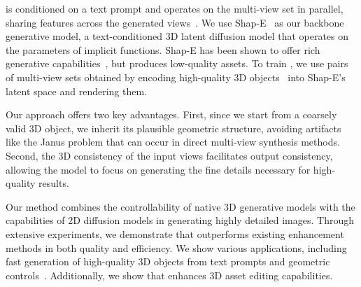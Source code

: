 \ourname{} is conditioned on a text prompt and operates on the multi-view set in parallel, sharing features across the generated views~\cite{shi2024mvdream, shi2023zero123singleimageconsistent}. We use Shap-E~\cite{jun2023shape} as our backbone generative model, a text-conditioned 3D latent diffusion model that operates on the parameters of implicit functions. Shap-E has been shown to offer rich generative capabilities~\cite{chen2023shapeditor, sella2024spicee}, but produces low-quality assets. To train \ourname, we use pairs of multi-view sets obtained by encoding high-quality 3D objects~\cite{Deitke_2023} into Shap-E's latent space and rendering them.


Our approach offers two key advantages. First, since we start from a coarsely valid 3D object, we inherit its plausible geometric structure, avoiding artifacts like the Janus problem that can occur in direct multi-view synthesis methods. Second, the 3D consistency of the input views facilitates output consistency, allowing the model to focus on generating the fine details necessary for high-quality results.


Our method combines the controllability of native 3D generative models with the capabilities of 2D diffusion models in generating highly detailed images. Through extensive experiments, we demonstrate that \ourname{} outperforms existing enhancement methods in both quality and efficiency. We show various applications, including fast generation of high-quality 3D objects from text prompts and geometric controls~\cite{sella2024spicee}. Additionally, we show that \ourname{} enhances 3D asset editing capabilities.


